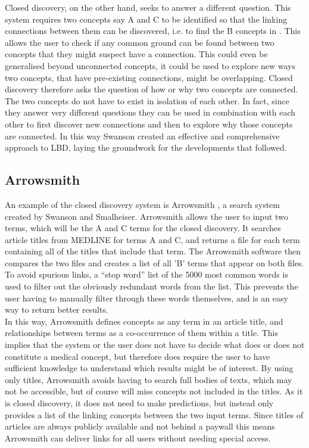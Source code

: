 \documentclass{l4proj}
\begin{document}
Closed discovery, on the other hand, seeks to answer a different question. This system requires two concepts say A and C to be identified so that the linking connections between them can be discovered, i.e. to find the B concepts in . This allows the user to check if any common ground can be found between two concepts that they might suspect have a connection. This could even be generalised beyond unconnected concepts, it could be used to explore new ways two concepts, that have pre-existing connections, might be overlapping. Closed discovery therefore asks the question of how or why two concepts are connected. The two concepts do not have to exist in isolation of each other. In fact, since they answer very different questions they can be used in combination with each other to first discover new connections and then to explore why those concepts are connected. In this way Swanson created an effective and comprehensive approach to LBD, laying the groundwork for the developments that followed. \\ 

\subsection{Arrowsmith}

An example of the closed discovery system is Arrowsmith \citep{swanson_interactive_1997}, a search system created by Swanson and Smalheiser. Arrowsmith allows the user to input two terms, which will be the A and C terms for the closed discovery. It searches article titles from MEDLINE \citep{medline} for terms A and C, and returns a file for each term containing all of the titles that include that term. The Arrowsmith software then compares the two files and creates a list of all 'B' terms that appear on both files. To avoid spurious links, a ``stop word'' list of the 5000 most common words is used to filter out the obviously redundant words from the list. This prevents the user having to manually filter through these words themselves, and is an easy way to return better results.\\

In this way, Arrowsmith defines concepts as any term in an article title, and relationships between terms as a co-occurrence of them within a title. This implies that the system or the user does not have to decide what does or does not constitute a medical concept, but therefore does require the user to have sufficient knowledge to understand which results might be of interest. By using only titles, Arrowsmith avoids having to search full bodies of texts, which may not be accessible, but of course will miss concepts not included in the titles. As it is closed discovery, it does not need to make predictions, but instead only provides a list of the linking concepts between the two input terms. Since titles of articles are always publicly available and not behind a paywall this means Arrowsmith can deliver links for all users without needing special access.\\
\end{document}
